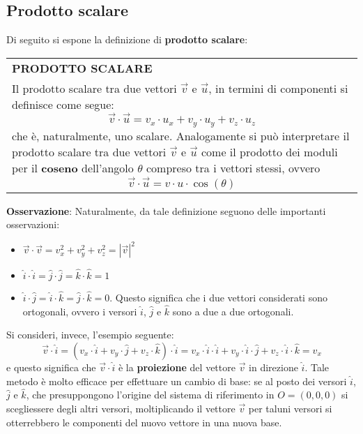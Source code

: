 \documentclass[a4paper]{extarticle}
\renewcommand\arraystretch{}
\begin{document}
\newpage
\noindent
\subsection{Prodotto scalare}
Di seguito si espone la definizione di \textbf{prodotto scalare}:

\vspace{1em}
\setlength{\tabcolsep}{14pt}
\renewcommand{\arraystretch}{2}
\noindent
\begin{tabularx}{\textwidth}{@{}|P|@{}}
    \hline
    {\textbf{PRODOTTO SCALARE}}\\
    \parbox{\linewidth}{Il prodotto scalare tra due vettori $\vec{v}$ e $\vec{u}$, in termini di componenti si definisce come segue:
    \[\vec{v} \cdot \vec{u} = v_x \cdot u_x + v_y \cdot u_y + v_z \cdot u_z\]
    che è, naturalmente, uno scalare.\\
    Analogamente si può interpretare il prodotto scalare tra due vettori $\vec{v}$ e $\vec{u}$ come il prodotto dei moduli per il \textbf{coseno} dell'angolo $\theta$ compreso tra i vettori stessi, ovvero
    \[\vec{v} \cdot \vec{u} = v \cdot u \cdot \cos(\theta)\]
    \vspace{-1mm}}\\
    \hline
\end{tabularx}

\vspace{1em}
\noindent
\textbf{Osservazione}: Naturalmente, da tale definizione seguono delle importanti osservazioni:
\begin{itemize}
  \item \(\vec{v} \cdot \vec{v} = v_x^2 + v_y^2 + v_z^2 = \left \vert \vec{v} \right \vert ^2\)
  \item \(\hat{i} \cdot \hat{i} = \hat{j} \cdot \hat{j} = \hat{k} \cdot \hat{k} = 1\)
  \item \(\hat{i} \cdot \hat{j} = \hat{i} \cdot \hat{k} = \hat{j} \cdot \hat{k} = 0\). Questo significa che i due vettori considerati sono ortogonali, ovvero i versori $\hat{i}$, $\hat{j}$ e $\hat{k}$ sono a due a due ortogonali.
\end{itemize}
Si consideri, invece, l'esempio seguente:
\[\vec{v} \cdot \hat{i} = \left(v_x \cdot \hat{i} + v_y \cdot \hat{j} + v_z \cdot \hat{k} \right) \cdot \hat{i} = v_x \cdot \hat{i} \cdot \hat{i} + v_y \cdot \hat{i} \cdot \hat{j} + v_z \cdot \hat{i} \cdot \hat{k} = v_x\]
e questo significa che $\vec{v} \cdot \hat{i}$ è la \textbf{proiezione} del vettore $\vec{v}$ in direzione $\hat{i}$. Tale metodo è molto efficace per effettuare un cambio di base: se al posto dei versori $\hat{i}$, $\hat{j}$ e $\hat{k}$, che presuppongono l'origine del sistema di riferimento in $O = (0,0,0)$ si scegliessere degli altri versori, moltiplicando il vettore $\vec{v}$ per taluni versori si otterrebbero le componenti del nuovo vettore in una nuova base.
\end{document}
